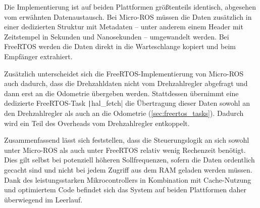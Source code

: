 Die Implementierung ist auf beiden Plattformen größtenteils identisch, abgesehen
vom erwähnten Datenaustausch. Bei Micro-ROS müssen die Daten zusätzlich in einer
dedizierten Struktur mit Metadaten -- unter anderem einem Header mit Zeitstempel
in Sekunden und Nanosekunden -- umgewandelt werden. Bei FreeRTOS werden die
Daten direkt in die Warteschlange kopiert und beim Empfänger extrahiert.

Zusätzlich unterscheidet sich die FreeRTOS-Implementierung von Micro-ROS auch
dadurch, dass die Drehzahldaten nicht vom Drehzahlregler abgefragt und dann erst
an die Odometrie übergeben werden. Stattdessen übernimmt eine dedizierte
FreeRTOS-Task \texttt|hal_fetch| die Übertragung dieser Daten sowohl an
den Drehzahlregler als auch an die Odometrie (\ref{sec:freertos_tasks}). Dadurch
wird ein Teil des Overheads vom Drehzahlregler entkoppelt.

Zusammenfassend lässt sich feststellen, dass die Steuerungslogik an sich sowohl
unter Micro-ROS als auch unter FreeRTOS relativ wenig Rechenzeit benötigt. Dies
gilt selbst bei potenziell höheren Sollfrequenzen, sofern die Daten ordentlich
gecacht sind und nicht bei jedem Zugriff aus dem RAM geladen werden müssen. Dank
des leistungsstarken Mikrocontrollers in Kombination mit Cache-Nutzung und
optimiertem Code befindet sich das System auf beiden Plattformen daher
überwiegend im Leerlauf.
